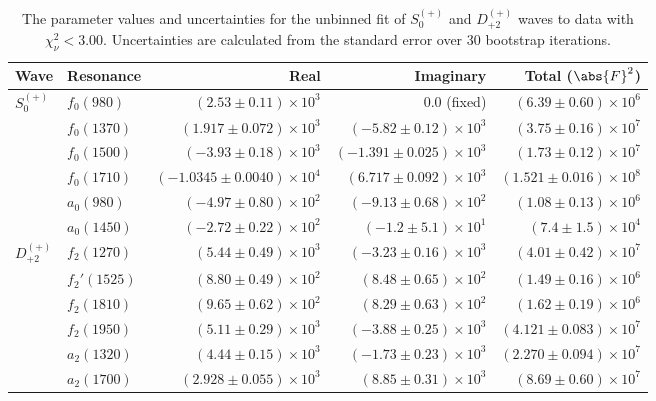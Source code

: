 \begin{table}[ht]
    \begin{center}
        \begin{tabular}{llrrr}\toprule
        Wave & Resonance & Real & Imaginary & Total ($\abs{F}^2$) \\\midrule
$S_{0}^{(+)}$ & $f_{0}(980)$ & $(2.53 \pm 0.11) \times 10^{3}$ & $0.0$ (fixed) & $(6.39 \pm 0.60) \times 10^{6}$ \\
 & $f_{0}(1370)$ & $(1.917 \pm 0.072) \times 10^{3}$ & $(-5.82 \pm 0.12) \times 10^{3}$ & $(3.75 \pm 0.16) \times 10^{7}$ \\
 & $f_{0}(1500)$ & $(-3.93 \pm 0.18) \times 10^{3}$ & $(-1.391 \pm 0.025) \times 10^{3}$ & $(1.73 \pm 0.12) \times 10^{7}$ \\
 & $f_{0}(1710)$ & $(-1.0345 \pm 0.0040) \times 10^{4}$ & $(6.717 \pm 0.092) \times 10^{3}$ & $(1.521 \pm 0.016) \times 10^{8}$ \\
 & $a_{0}(980)$ & $(-4.97 \pm 0.80) \times 10^{2}$ & $(-9.13 \pm 0.68) \times 10^{2}$ & $(1.08 \pm 0.13) \times 10^{6}$ \\
 & $a_{0}(1450)$ & $(-2.72 \pm 0.22) \times 10^{2}$ & $(-1.2 \pm 5.1) \times 10^{1}$ & $(7.4 \pm 1.5) \times 10^{4}$ \\
$D_{+2}^{(+)}$ & $f_{2}(1270)$ & $(5.44 \pm 0.49) \times 10^{3}$ & $(-3.23 \pm 0.16) \times 10^{3}$ & $(4.01 \pm 0.42) \times 10^{7}$ \\
 & $f_{2}'(1525)$ & $(8.80 \pm 0.49) \times 10^{2}$ & $(8.48 \pm 0.65) \times 10^{2}$ & $(1.49 \pm 0.16) \times 10^{6}$ \\
 & $f_{2}(1810)$ & $(9.65 \pm 0.62) \times 10^{2}$ & $(8.29 \pm 0.63) \times 10^{2}$ & $(1.62 \pm 0.19) \times 10^{6}$ \\
 & $f_{2}(1950)$ & $(5.11 \pm 0.29) \times 10^{3}$ & $(-3.88 \pm 0.25) \times 10^{3}$ & $(4.121 \pm 0.083) \times 10^{7}$ \\
 & $a_{2}(1320)$ & $(4.44 \pm 0.15) \times 10^{3}$ & $(-1.73 \pm 0.23) \times 10^{3}$ & $(2.270 \pm 0.094) \times 10^{7}$ \\
 & $a_{2}(1700)$ & $(2.928 \pm 0.055) \times 10^{3}$ & $(8.85 \pm 0.31) \times 10^{3}$ & $(8.69 \pm 0.60) \times 10^{7}$ \\\bottomrule
        \end{tabular}
    \caption{The parameter values and uncertainties for the unbinned fit of $S_{0}^{(+)}$ and $D_{+2}^{(+)}$ waves to data with $\chi^2_\nu < 3.00$. Uncertainties are calculated from the standard error over $30$ bootstrap iterations.}\label{tab:unbinned-fit-chisqdof-3.0-Sp0p-Dp2p}
    \end{center}
\end{table}
